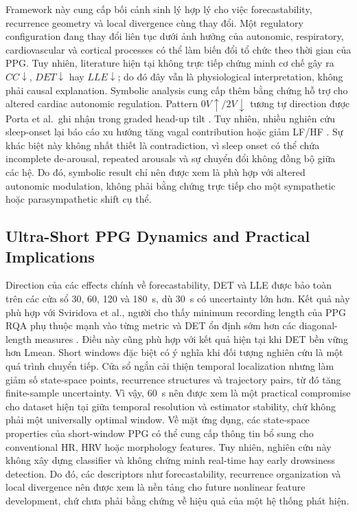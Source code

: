 Framework này cung cấp bối cảnh sinh lý hợp lý cho việc forecastability, recurrence geometry và local divergence cùng thay đổi. Một regulatory configuration đang thay đổi liên tục dưới ảnh hưởng của autonomic, respiratory, cardiovascular và cortical processes có thể làm biến đổi tổ chức theo thời gian của PPG. Tuy nhiên, literature hiện tại không trực tiếp chứng minh cơ chế gây ra $CC\downarrow$, $DET\downarrow$ hay $LLE\downarrow$; do đó đây vẫn là physiological interpretation, không phải causal explanation. Symbolic analysis cung cấp thêm bằng chứng hỗ trợ cho altered cardiac autonomic regulation. Pattern $0V\uparrow / 2V\downarrow$ tương tự direction được Porta et al.\ ghi nhận trong graded head-up tilt \cite{porta2007_symbolic}. Tuy nhiên, nhiều nghiên cứu sleep-onset lại báo cáo xu hướng tăng vagal contribution hoặc giảm LF/HF \cite{shinar2006,carrington2003,tsai2019,vaussenat2026}. Sự khác biệt này không nhất thiết là contradiction, vì sleep onset có thể chứa incomplete de-arousal, repeated arousals và sự chuyển đổi không đồng bộ giữa các hệ. Do đó, symbolic result chỉ nên được xem là phù hợp với altered autonomic modulation, không phải bằng chứng trực tiếp cho một sympathetic hoặc parasympathetic shift cụ thể.

\subsection{Ultra-Short PPG Dynamics and Practical Implications}

Direction của các effects chính về forecastability, DET và LLE được bảo toàn trên các cửa sổ 30, 60, 120 và 180~s, dù 30~s có uncertainty lớn hơn. Kết quả này phù hợp với Sviridova et al., người cho thấy minimum recording length của PPG RQA phụ thuộc mạnh vào từng metric và DET ổn định sớm hơn các diagonal-length measures \cite{sviridova2022}. Điều này cũng phù hợp với kết quả hiện tại khi DET bền vững hơn Lmean. Short windows đặc biệt có ý nghĩa khi đối tượng nghiên cứu là một quá trình chuyển tiếp. Cửa sổ ngắn cải thiện temporal localization nhưng làm giảm số state-space points, recurrence structures và trajectory pairs, từ đó tăng finite-sample uncertainty. Vì vậy, 60~s nên được xem là một practical compromise cho dataset hiện tại giữa temporal resolution và estimator stability, chứ không phải một universally optimal window. Về mặt ứng dụng, các state-space properties của short-window PPG có thể cung cấp thông tin bổ sung cho conventional HR, HRV hoặc morphology features. Tuy nhiên, nghiên cứu này không xây dựng classifier và không chứng minh real-time hay early drowsiness detection. Do đó, các descriptors như forecastability, recurrence organization và local divergence nên được xem là nền tảng cho future nonlinear feature development, chứ chưa phải bằng chứng về hiệu quả của một hệ thống phát hiện.

